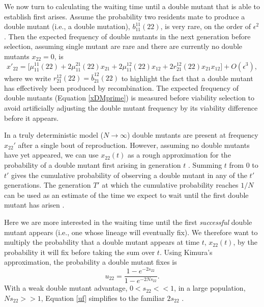 \documentclass[review,3p,authoryear]{elsarticle}
\begin{document}
We now turn to calculating the waiting time until a double mutant that is able to establish first arises.
Assume the probability two residents mate to produce a double mutant (i.e., a double mutation), $b_{11}^{11}(22)$, is very rare, on the order of $\epsilon^2$.
Then the expected frequency of double mutants in the next generation before selection, assuming single mutant are rare and there are currently no double mutants $x_{22}=0$, is 
\begin{equation}\label{xDMprime}
x'_{22} = \Big[ \mu_{11}^{11}(22) + 2 \mu_{11}^{21}(22) x_{21} + 2 \mu_{11}^{12}(22) x_{12} + 2 r_{21}^{12}(22) x_{21} x_{12} \Big] + O(\epsilon^3),
\end{equation}
where we write $r_{21}^{12}(22) = \bar{b}_{21}^{12}(22)$ to highlight the fact that a double mutant has effectively been produced by recombination.
The expected frequency of double mutants (Equation \ref{xDMprime}) is measured before viability selection to avoid artificially adjusting the double mutant frequency by its viability difference before it appears.

In a truly deterministic model ($N\rightarrow\infty$) double mutants are present at frequency $x_{22}'$ after a single bout of reproduction.
However, assuming no double mutants have yet appeared, we can use $x_{22}(t)$ as a rough approximation for the probability of a double mutant first arising in generation $t$ \citep{Christiansen1998}.
Summing $t$ from 0 to $t'$ gives the cumulative probability of observing a double mutant in any of the $t'$ generations. 
The generation $T'$ at which the cumulative probability reaches $1/N$ can be used as an estimate of the time we expect to wait until the first double mutant has arisen \citep{Christiansen1998}. 

Here we are more interested in the waiting time until the first \textit{successful} double mutant appears (i.e., one whose lineage will eventually fix).
We therefore want to multiply the probability that a double mutant appears at time $t$, $x_{22}(t)$, by the probability it will fix before taking the sum over $t$.
Using Kimura's \citeyearpar{Kimura1962} approximation, the probability a double mutant fixes is 
\begin{equation}\label{uf}
u_{22}=\frac{1-e^{-2 s_{22}}}{1-e^{-2 N s_{22}}}.
\end{equation}
With a weak double mutant advantage, $0<s_{22}<<1$, in a large population, $Ns_{22}>>1$, Equation \eqref{uf} simplifies to the familiar $2s_{22}$ \citep{Haldane1927}.
\end{document}
